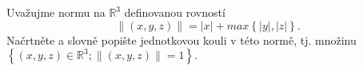 Uvažujme normu na $\mathbb{R}^{3}$ definovanou rovností 
$$\left \| \left ( x,y,z \right ) \right \|=\left | x \right |+max\left \{ \left | y \right |,\left | z \right | \right \}.$$
Načrtněte a slovně popište jednotkovou kouli v této normě, tj. množinu 
$\left \{ \left ( x,y,z \right ) \in \mathbb{R}^{3}; \left \| \left ( x,y,z \right ) \right \|=1\right \}.$
